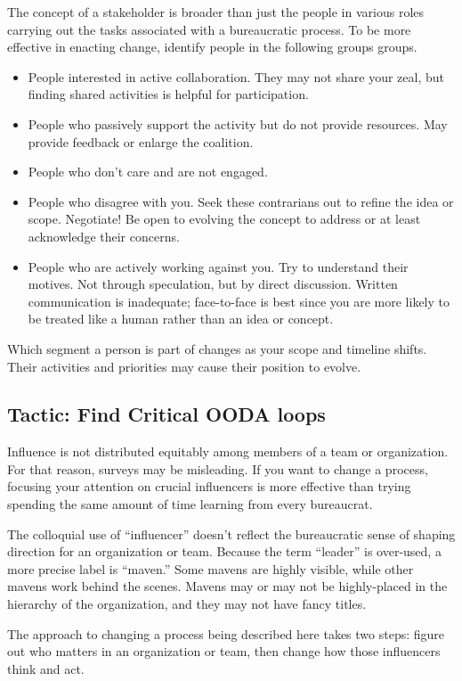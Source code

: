 The concept of a \gls{stakeholder} is broader than just the people in various roles carrying out the tasks associated with a bureaucratic process. 
To be more effective in enacting change, identify people in the following groups groups. 
\begin{itemize}
 \item People interested in active collaboration. They may not share your zeal, but finding shared activities is helpful for participation.
    \item People who passively support the activity but do not provide resources. May provide feedback or enlarge the coalition.
    \item People who don't care and are not engaged.
    \item People who disagree with you. Seek these contrarians out to refine the idea or scope. Negotiate! Be open to evolving the concept to address or at least acknowledge their concerns.
    \item People who are actively working against you. Try to understand their motives. Not through speculation, but by direct discussion. Written communication is inadequate; face-to-face is best since you are more likely to be treated like a human rather than an idea or concept. 
\end{itemize}

Which segment a person is part of changes as your scope and timeline shifts. Their activities and priorities may cause their position to evolve. 

\subsection*{Tactic: Find Critical OODA loops}

Influence is not distributed equitably among members of a team or organization. For that reason, surveys may be misleading. If you want to change a process, focusing your attention on crucial influencers is more effective than trying spending the same amount of time learning from every bureaucrat. 

The colloquial use of ``influencer'' doesn't reflect the bureaucratic sense of shaping direction for an organization or team. Because the term ``leader'' is over-used, a more precise label is ``maven.'' Some mavens are highly visible, while other mavens work behind the scenes.
Mavens may or may not be highly-placed in the hierarchy of the organization, and they may not have fancy titles. 

The approach to changing a process being described here takes two steps: figure out who matters in an organization or team, then change how those influencers think and act.

